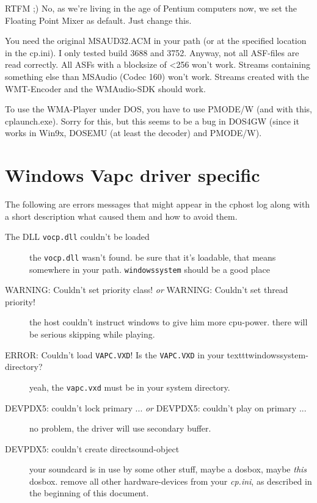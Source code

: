 {RTFM ;)  No, as we're living in the age of Pentium computers now, we set
the Floating Point Mixer as default. Just change this.}

{You need the original MSAUD32.ACM in your path (or at the specified
location in the cp.ini). I only tested build 3688 and 3752.
Anyway, not all ASF-files are read correctly. All ASFs with a
blocksize of <256 won't work. Streams containing something else than
MSAudio (Codec 160) won't work.
Streams created with the WMT-Encoder and the WMAudio-SDK should work.

To use the WMA-Player under DOS, you have to use PMODE/W (and with this,
cplaunch.exe). Sorry for this, but this seems to be a bug in DOS4GW
(since it works in Win9x, DOSEMU (at least the decoder) and PMODE/W).}

\section{Windows Vapc driver specific}
\label{faqvapc}
The following are errors messages that might appear in the cphost log
along with a short description what caused them and how to avoid them.

\begin{description}

\item[The DLL \texttt{vocp.dll} couldn't be loaded]
the \texttt{vocp.dll} wasn't found. be sure that it's loadable, that
means somewhere in your path. \texttt{windowssystem} should
be a good place

\item[WARNING: Couldn't set priority class! \emph{or} WARNING: Couldn't set thread priority!]
the host couldn't instruct windows to give him more cpu-power. there
will be serious skipping while playing.

\item[ERROR: Couldn't load \texttt{VAPC.VXD}! Is the \texttt{VAPC.VXD} in your texttt{windowssystem}-directory?]
yeah, the \texttt{vapc.vxd} must be in your system directory.

\item[DEVPDX5: couldn't lock primary ... \emph{or} DEVPDX5: couldn't play on primary ...]
no problem, the driver will use secondary buffer.

\item[DEVPDX5: couldn't create directsound-object]
your soundcard is in use by some other stuff, maybe a dosbox, maybe
\emph{this} dosbox. remove all other hardware-devices from your
\emph{cp.ini}, as described in the beginning of this document.

\end{description}

